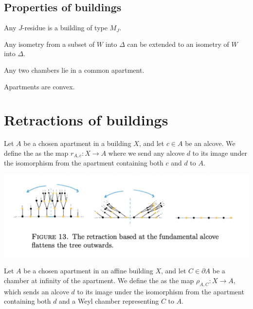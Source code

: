 \documentclass[11pt]{article}
\begin{document}
\subsection{Properties of buildings}
\begin{theorem}
    Any $J$-residue is a building of type $M_J$. 
\end{theorem}

\begin{theorem}
    Any isometry from a subset of $W$ into $\Delta$ can be extended to an isometry of $W$ into $\Delta$.
\end{theorem}

\begin{corollary}
    Any two chambers lie in a common apartment.
\end{corollary}

\begin{theorem}
    Apartments are convex.
\end{theorem}


\section{Retractions of buildings}



\begin{definition}
    Let $A$ be a chosen apartment in a building $X$, and let $c\in A$ be an alcove. We define the  as the map $r_{A,c}:X\longrightarrow A$ where we send any alcove $d$ to its image under the isomorphism from the apartment containing both $c$ and $d$ to $A$. 
\end{definition}

\includegraphics[scale=0.7]{Screenshot 2023-02-15 at 13.32.45.png}\\

\begin{definition}
    Let $A$ be a chosen apartment in an affine building $X$, and let $C\in \partial A$ be a chamber at infinity of the apartment. We define the  as the map $\rho_{A,C}:X\longrightarrow A$, which sends an alcove $d$ to its image under the isomorphism from the apartment containing both $d$ and a Weyl chamber representing $C$ to $A$. 
\end{definition}
\end{document}
